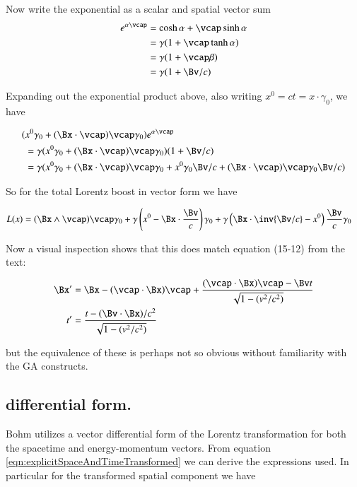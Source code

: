 \documentclass{article}
\begin{document}
Now write the exponential as a scalar and spatial vector sum
\begin{align*}
e^{\alpha \vcap}
&= 
\cosh\alpha 
+\vcap \sinh\alpha 
\\
&= 
\gamma (1 +\vcap \tanh\alpha )
\\
&= 
\gamma (1 +\vcap \beta)
\\
&= 
\gamma (1 + \Bv/c )
\\
\end{align*}

Expanding out the exponential product above, also writing $x^0 = ct = x \cdot \gamma_0$, we have

\begin{align*}
( &x^0 \gamma_0 + (\Bx \cdot \vcap) \vcap \gamma_0 ) e^{\alpha \vcap} \\
&=
\gamma ( x^0 \gamma_0 + (\Bx \cdot \vcap) \vcap \gamma_0 ) ( 1 + \Bv/c ) \\
&=
\gamma ( 
x^0 \gamma_0 
+ (\Bx \cdot \vcap) \vcap \gamma_0 
+x^0 \gamma_0 \Bv/c  
+ (\Bx \cdot \vcap) \vcap \gamma_0 \Bv/c
) \\
\end{align*}

So for the total Lorentz boost in vector form we have

\begin{align}\label{eqn:fourVectorExpanded}
L(x)
&=
(\Bx \wedge \vcap) \vcap \gamma_0 +
\gamma \left(x^0 - \Bx \cdot \frac{\Bv}{c} \right) \gamma_0
+ \gamma \left( \Bx \cdot \inv{\Bv/c} - x^0 \right) \frac{\Bv}{c} \gamma_0
\end{align}

Now a visual inspection shows that this does match
equation (15-12) from the text:

\begin{align}\label{eqn:explicitSpaceAndTimeTransformed}
\Bx' 
&= \Bx - (\vcap \cdot \Bx) \vcap + \frac{ (\vcap \cdot \Bx )\vcap - \Bv t }{ \sqrt{1 - (v^2/c^2)} } \\
t' 
&= \frac{ t - (\Bv \cdot \Bx )/c^2 }{ \sqrt{1 - (v^2/c^2)} } 
\end{align}

but the equivalence of these is perhaps not so obvious without familiarity
with the GA constructs.

\subsection{ differential form. }

Bohm utilizes a vector differential form of the Lorentz transformation
for both the spacetime and energy-momentum vectors.  From equation
\ref{eqn:explicitSpaceAndTimeTransformed}
we can derive the expressions used.  In particular for the transformed
spatial component we have
\end{document}
